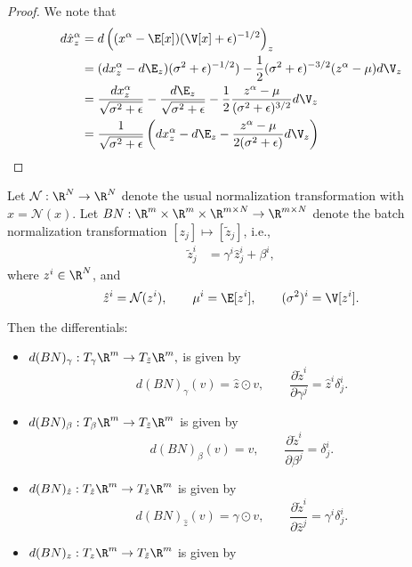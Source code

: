 \begin{proof}
	We note that
	\begin{align*}
		d\hat{x}^\alpha_z&=d\left((x^\alpha-\E[x])(\V[x]+\epsilon)^{-1/2}\right)_z\\
		&=(dx^\alpha_z-d\E_z)(\sigma^2+\epsilon)^{-1/2})-\frac{1}{2}(\sigma^2+\epsilon)^{-3/2}(z^\alpha-\mu)d\V_z\\
		&=\frac{dx^\alpha_z}{\sqrt{\sigma^2+\epsilon}}-\frac{d\E_z}{\sqrt{\sigma^2+\epsilon}}-\frac{1}{2}\frac{z^\alpha-\mu}{(\sigma^2+\epsilon)^{3/2}}d\V_z\\
		&=\frac{1}{\sqrt{\sigma^2+\epsilon}}\left(dx^\alpha_z-d\E_z-\frac{z^\alpha-\mu}{2(\sigma^2+\epsilon)}d\V_z\right)
	\end{align*}
\end{proof}


\begin{prop}
	Let $\mathcal{N}:\R^N\to\R^N$ denote the usual normalization transformation with $\hat{x}=\mathcal{N}(x)$.
	Let $BN:\R^m\times\R^m\times\R^{m\times N}\to\R^{m\times N}$ denote the batch normalization transformation $[z_j]\mapsto[\tilde{z}_j]$, i.e.,
	\begin{align*}
		\tilde{z}^i_j&=\gamma^i\hat{z}^i_j+\beta^i,
	\end{align*}
	where $z^i\in\R^N$, and
	$$\hat{z}^i=\mathcal{N}(z^i),\qquad \mu^i=\E[z^i],\qquad(\sigma^2)^i=\V[z^i].$$
	
	
	
	
	Then the differentials:
	\begin{itemize}	
		\item $d(BN)_\gamma:T_\gamma\R^m\to T_{\tilde{z}}\R^m,$ is given by
		$$d(BN)_\gamma(v)=\hat{z}\odot v,\qquad\frac{\partial\tilde{z}^i}{\partial\gamma^j}=\hat{z}^i\delta^i_j.$$
		\item $d(BN)_\beta:T_\beta\R^m\to T_{\tilde{z}}\R^m$ is given by
		$$d(BN)_\beta(v)=v,\qquad\frac{\partial\tilde{z}^i}{\partial \beta^j}=\delta^i_j.$$
		\item $d(BN)_{\hat{z}}:T_{\hat{z}}\R^m\to T_{\tilde{z}}\R^m$ is given by
		$$d(BN)_{\hat{z}}(v)=\gamma\odot v,\qquad\frac{\partial\tilde{z}^i}{\partial\hat{z}^j}=\gamma^i\delta^i_j.$$
		\item $d(BN)_z:T_z\R^m\to T_{\tilde{z}}\R^m$ is given by
		
	\end{itemize}
\end{prop}










